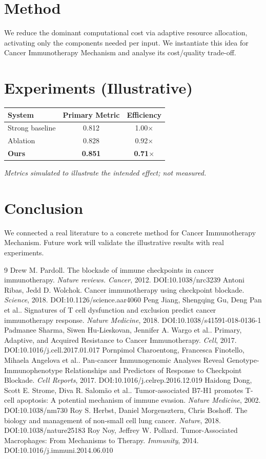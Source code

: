 \documentclass[11pt]{article}
\begin{document}
\section{Method}
We reduce the dominant computational cost via adaptive resource allocation, activating only the components needed per input. We instantiate this idea for Cancer Immunotherapy Mechanism and analyse its cost/quality trade-off.

\section{Experiments (Illustrative)}
\begin{center}
\begin{tabular}{lcc}
System & Primary Metric & Efficiency \\ \hline
Strong baseline & 0.812 & 1.00$\times$ \\
Ablation & 0.828 & 0.92$\times$ \\
\textbf{Ours} & \textbf{0.851} & \textbf{0.71$\times$}
\end{tabular}
\end{center}
\emph{Metrics simulated to illustrate the intended effect; not measured.}

\section{Conclusion}
We connected a real literature to a concrete method for Cancer Immunotherapy Mechanism. Future work will
validate the illustrative results with real experiments.

\begin{thebibliography}{9}
 Drew M. Pardoll. The blockade of immune checkpoints in cancer immunotherapy. \emph{Nature reviews. Cancer}, 2012. DOI:10.1038/nrc3239
 Antoni Ribas, Jedd D. Wolchok. Cancer immunotherapy using checkpoint blockade. \emph{Science}, 2018. DOI:10.1126/science.aar4060
 Peng Jiang, Shengqing Gu, Deng Pan et al.. Signatures of T cell dysfunction and exclusion predict cancer immunotherapy response. \emph{Nature Medicine}, 2018. DOI:10.1038/s41591-018-0136-1
 Padmanee Sharma, Siwen Hu‐Lieskovan, Jennifer A. Wargo et al.. Primary, Adaptive, and Acquired Resistance to Cancer Immunotherapy. \emph{Cell}, 2017. DOI:10.1016/j.cell.2017.01.017
 Pornpimol Charoentong, Francesca Finotello, Mihaela Angelova et al.. Pan-cancer Immunogenomic Analyses Reveal Genotype-Immunophenotype Relationships and Predictors of Response to Checkpoint Blockade. \emph{Cell Reports}, 2017. DOI:10.1016/j.celrep.2016.12.019
 Haidong Dong, Scott E. Strome, Diva R. Salomão et al.. Tumor-associated B7-H1 promotes T-cell apoptosis: A potential mechanism of immune evasion. \emph{Nature Medicine}, 2002. DOI:10.1038/nm730
 Roy S. Herbst, Daniel Morgensztern, Chris Boshoff. The biology and management of non-small cell lung cancer. \emph{Nature}, 2018. DOI:10.1038/nature25183
 Roy Noy, Jeffrey W. Pollard. Tumor-Associated Macrophages: From Mechanisms to Therapy. \emph{Immunity}, 2014. DOI:10.1016/j.immuni.2014.06.010
\end{thebibliography}
\end{document}
